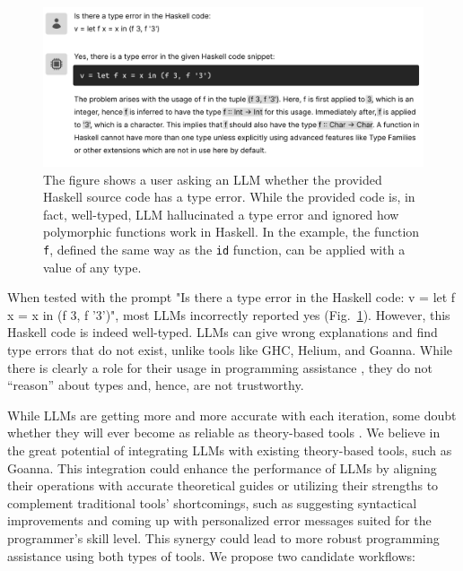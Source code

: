 \documentclass[pdflatex,lineno,sn-nature,Numbered]{sn-jnl}%
\begin{document}
\begin{figure}[hbt]
  \includegraphics[width=\linewidth]{images/LLM2.pdf}
  \caption[An example where LLM identified a type error in well-typed source code]{\label{fig:llm2}
  The figure shows a user asking an LLM whether the provided Haskell source code has a type error. While the provided code is, in fact, well-typed, LLM hallucinated a type error and ignored how polymorphic functions work in Haskell. In the example, the function \texttt{f},  defined the same way as the \texttt{id} function, can be applied with a value of any type.
    } 
\end{figure}

When tested with the prompt "Is there a type error in the Haskell code: v = let f x = x in (f 3, f '3')", most LLMs incorrectly reported yes (Fig.~\ref{fig:llm2}). However, this Haskell code is indeed well-typed. LLMs can give wrong explanations and find type errors that do not exist, unlike tools like GHC, Helium, and Goanna. While there is clearly a role for their usage in programming assistance \cite{Lee2024-hs}, they do not “reason” about types and, hence, are not trustworthy.

While LLMs are getting more and more accurate with each iteration, some doubt whether they will ever become as reliable as theory-based tools \cite{Berglund2023-ig}. We believe in the great potential of integrating LLMs with existing theory-based tools, such as Goanna. This integration could enhance the performance of LLMs by aligning their operations with accurate theoretical guides or utilizing their strengths to complement traditional tools' shortcomings, such as suggesting syntactical improvements and coming up with personalized error messages suited for the programmer's skill level. This synergy could lead to more robust programming assistance using both types of tools. We propose two candidate workflows:

\end{document}
